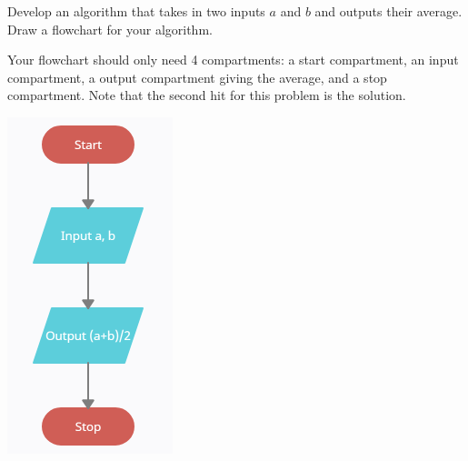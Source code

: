 \documentclass{ximera}
\begin{document}
\begin{question}
\begin{center}
\begin{question} 
	Develop an algorithm that takes in two inputs $a$ and $b$ and outputs their average. Draw a flowchart for your algorithm.
	\begin{hint}
		Your flowchart should only need 4 compartments: a start compartment, an input compartment, a output compartment giving the average, and a stop compartment. Note that the second hit for this problem is the solution.
	\end{hint}
	\begin{hint}
		\begin{center}
		\includegraphics{average.png}
		\end{center}
	\end{hint}
\end{question}
	
\begin{question}
	
\end{question}


\end{center}
\end{question}
\end{document}

